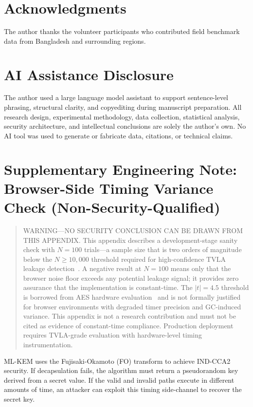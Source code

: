 \documentclass[11pt,a4paper]{article}
\def\textbf#1{#1}%
\begin{document}
\section*{Acknowledgments}
\noindent
The author thanks the volunteer participants who contributed field benchmark data from Bangladesh and surrounding regions.

\section*{AI Assistance Disclosure}
\noindent
The author used a large language model assistant to support sentence-level phrasing, structural clarity, and copyediting during manuscript preparation. All research design, experimental methodology, data collection, statistical analysis, security architecture, and intellectual conclusions are solely the author's own. No AI tool was used to generate or fabricate data, citations, or technical claims.

\appendix

\section{Supplementary Engineering Note: Browser-Side Timing Variance Check (Non-Security-Qualified)}
\label{sec:heuristic-note}

\begin{quote}
\textbf{WARNING---NO SECURITY CONCLUSION CAN BE DRAWN FROM THIS APPENDIX.} This appendix describes a development-stage sanity check with $N=100$ trials---a sample size that is two orders of magnitude below the $N \geq 10{,}000$ threshold required for high-confidence TVLA leakage detection~\cite{schneider2015leakage}. A negative result at $N=100$ means only that the browser noise floor exceeds any potential leakage signal; it provides \textbf{zero assurance} that the implementation is constant-time. The $|t| = 4.5$ threshold is borrowed from AES hardware evaluation~\cite{GJJR11} and is not formally justified for browser environments with degraded timer precision and GC-induced variance. \textbf{This appendix is not a research contribution and must not be cited as evidence of constant-time compliance.} Production deployment requires TVLA-grade evaluation with hardware-level timing instrumentation.
\end{quote}

ML-KEM uses the Fujisaki-Okamoto (FO) transform to achieve IND-CCA2 security. If decapsulation fails, the algorithm must return a pseudorandom key derived from a secret value. If the valid and invalid paths execute in different amounts of time, an attacker can exploit this timing side-channel to recover the secret key.
\end{document}
